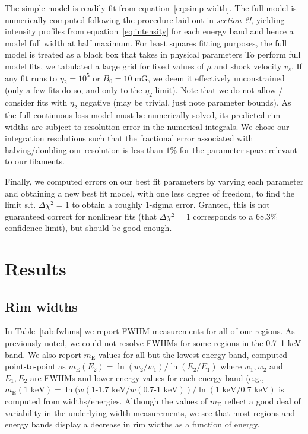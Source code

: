 \documentclass[iop, apj, numberedappendix, twocolappendix]{emulateapj}
\newcommand*{\mt}{\mathrm}
\newcommand*{\unit}[1]{\;\mt{#1}}  %
\newcommand*{\mE}{m_\mathrm{E}}
\begin{document}
The simple model is readily fit from equation~\eqref{eq:simp-width}.
The full model is numerically computed following the procedure laid out in
\emph{section ?!}, yielding intensity profiles from equation~\eqref{eq:intensity} for each
energy band and hence a model full width at half maximum.
For least squares fitting purposes, the full model is treated as a black box
that takes in physical parameters
To perform full model fits, we tabulated a large grid for fixed values of $\mu$
and shock velocity $v_s$.  If any fit runs to $\eta_2 = 10^5$ or $B_0 = 10
\unit{mG}$, we deem it effectively unconstrained (only a few fits do so, and
only to the $\eta_2$ limit).  Note that we do not allow / consider fits with
$\eta_2$ negative (may be trivial, just note parameter bounds).  As the full
continuous loss model must be numerically solved, its predicted rim widths are
subject to resolution error in the numerical integrals.  We chose our
integration resolutions such that the fractional error associated with
halving/doubling our resolution is less than $1\%$ for the parameter space
relevant to our filaments.

Finally, we computed errors on our best fit parameters by varying each
parameter and obtaining a new best fit model, with one less degree of freedom,
to find the limit s.t. $\Delta \chi^2 = 1$ to obtain a roughly 1-sigma error.
Granted, this is not guaranteed correct for nonlinear fits (that $\Delta \chi^2
= 1$ corresponds to a $68.3$\% confidence limit), but should be good enough.

\section{Results}

\subsection{Rim widths}
\label{sec:fwhm-results}

In Table~\ref{tab:fwhms} we report FWHM measurements for all of our regions.
As previously noted, we could not resolve FWHMs for some regions in the
0.7--1 keV band.  We also report $\mE$ values for all but the lowest energy
band, computed point-to-point as $\mE(E_2) = \ln(w_2/w_1) / \ln(E_2/E_1)$ where
$w_1, w_2$ and $E_1, E_2$ are FWHMs and lower energy values for each energy
band (e.g., $\mE(\text{1 keV}) = \ln(w(\text{1-1.7 keV}/w(\text{0.7-1 keV})) /
\ln(\text{1 keV}/\text{0.7 keV})$ is computed from widths/energies.  Although
the values of $\mE$ reflect a good deal of variability in the underlying width
measurements, we see that most regions and energy bands display a decrease in
rim widths as a function of energy.
\end{document}
